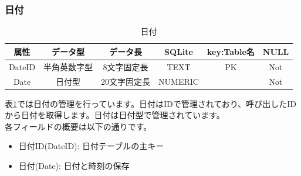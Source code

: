 \documentclass[a4j]{jarticle}
\begin{document}
\subsubsection{日付}
\begin{table}[H]
    \caption{日付}
    \label{tbl: date}
    \begin{center}
        \begin{tabular}{|c|c|c|c|c|c|} \hline
            属性 & データ型 & データ長 & SQLite & key:Table名 & NULL\\ \hline \hline
            DateID & 半角英数字型 & 8文字固定長 & TEXT & PK & Not\\ \hline
            Date & 日付型 & 20文字固定長 & NUMERIC & & Not\\ \hline
        \end{tabular}
    \end{center}
\end{table}
表\ref{tbl: date}では日付の管理を行っています。日付はIDで管理されており、呼び出したIDから日付を取得します。日付は日付型で管理されています。\\
各フィールドの概要は以下の通りです。
\begin{itemize}
  \item 日付ID(DateID):
  日付テーブルの主キー
  \item 日付(Date):
  日付と時刻の保存
\end{itemize}
\end{document}
